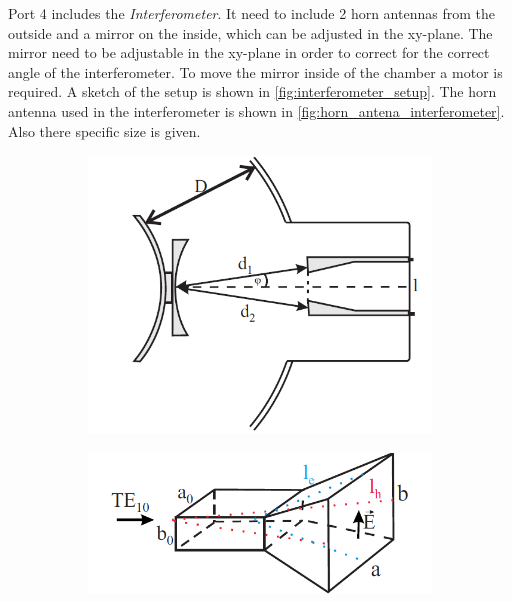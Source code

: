 Port 4 includes the \emph{Interferometer}.
It need to include 2 horn antennas from the outside and a mirror on the inside, which can be adjusted in the xy-plane.
The mirror need to be adjustable in the xy-plane in order to correct for the correct angle of the interferometer.
To move the mirror inside of the chamber a motor is required.
A sketch of the setup is shown in \autoref{fig:interferometer_setup}.
The horn antenna used in the interferometer is shown in \autoref{fig:horn_antena_interferometer}.
Also there specific size is given.

\begin{figure}[H]
    \centering
    \begin{subfigure}{0.4\textwidth}
        \centering
        \includegraphics[width=1\textwidth]{sections/imges/ports/interferometer.png}
        \label{fig:interferometer_setup}
    \end{subfigure}
    \hfill
    \begin{subfigure}{0.59\textwidth}
        \centering
        \includegraphics[width=1\textwidth]{sections/imges/ports/interferometer_horn_antena.png}

\end{subfigure}
\end{figure}
